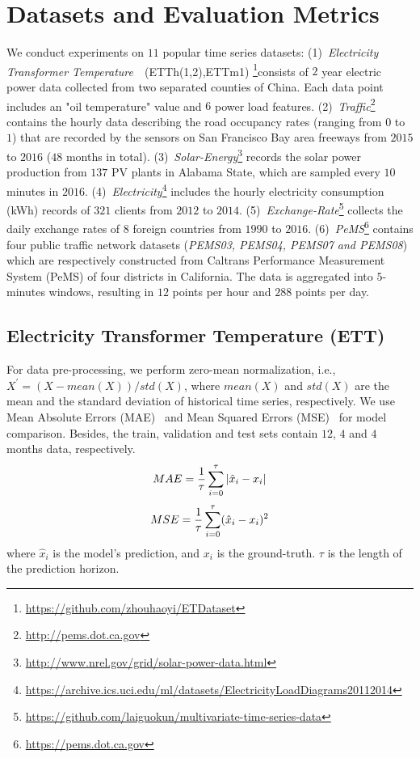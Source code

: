 \documentclass{article}
\begin{document}
\section{Datasets and Evaluation Metrics}
\label{sec:Evaluation}

We conduct experiments on $11$ popular time series datasets: (1)~\emph{Electricity Transformer Temperature}~\citep{Zhou2020InformerBE}~(ETTh(1,2),ETTm1) \footnote{\url{https://github.com/zhouhaoyi/ETDataset}}consists of $2$ year electric power data collected from two separated counties of China. Each data point includes an "oil temperature" value and $6$ power load features.
(2)~\emph{Traffic}\footnote{\url{http://pems.dot.ca.gov}} contains the hourly data describing the road occupancy rates (ranging from $0$ to $1$) that are recorded by the sensors on San Francisco Bay area freeways from $2015$ to $2016$ ($48$ months in total). 
(3)~\emph{Solar-Energy}\footnote{\url{http://www.nrel.gov/grid/solar-power-data.html}} records the solar power production from $137$ PV plants in Alabama State, which are sampled every $10$ minutes in $2016$.
(4)~\emph{Electricity}\footnote{\url{https://archive.ics.uci.edu/ml/datasets/ElectricityLoadDiagrams20112014}} includes the hourly electricity consumption (kWh) records of $321$ clients from $2012$ to $2014$.
(5)~\emph{Exchange-Rate}\footnote{\url{https://github.com/laiguokun/multivariate-time-series-data}} collects the daily exchange rates of $8$ foreign countries from $1990$ to $2016$.
(6)~\textit{PeMS}\footnote{\url{https://pems.dot.ca.gov}} contains four public traffic network datasets (\emph{PEMS03, PEMS04, PEMS07 and PEMS08}) which are respectively constructed from Caltrans Performance Measurement System (PeMS) of four districts in California. The data is aggregated into $5$-minutes windows, resulting in $12$ points per hour and $288$ points per day. 

\subsection{Electricity Transformer Temperature (ETT)}



For data pre-processing, we perform zero-mean normalization, i.e., $X^{'} = (X - mean(X))/std(X)$, where $mean(X)$ and $std(X)$ are the mean and the standard deviation of historical time series, respectively.
We use Mean Absolute Errors (MAE)~\citep{Hyndman2006AnotherLA} and Mean Squared Errors (MSE)~\citep{Makridakis1982TheAO} for model comparison. Besides, the train, validation and test sets contain $12$, $4$ and $4$ months data, respectively. 
\begin{equation}
\scriptsize
    MAE = \frac{1}{\tau}\sum_{i =0}^{\tau}|\hat{x}_i -x_i |
\end{equation}
\begin{equation}
\scriptsize
    MSE = \frac{1}{\tau}\sum_{i =0}^{\tau}(\hat{x}_i -x_i)^2
\end{equation}
where $\hat{x}_i$ is the model's prediction, and $x_i$ is the ground-truth. $\tau$ is  the length of the prediction horizon.
\end{document}
